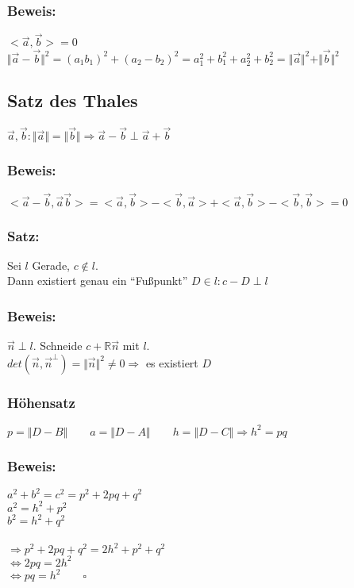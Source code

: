 \subsubsection{Beweis:}
$<\vec{a},\vec{b}>=0 $\\
$\Vert \vec{a} - \vec{b} \Vert^{2} = (a_{1}b_{1})^{2} + (a_{2} - b_{2})^{2} = a_{1}^{2}+b_{1}^{2}+a_{2}^{2}+b_{2}^{2} = \Vert \vec{a} \Vert^{2} + \Vert \vec{b} \Vert^{2}$
%
%
%
\subsection{Satz des Thales}
$\vec{a},\vec{b}: \Vert \vec{a} \Vert =\Vert \vec{b} \Vert \Rightarrow \vec{a} - \vec{b} \perp  \vec{a} + \vec{b}$
%
%
%
\subsubsection{Beweis:}
$<\vec{a}-\vec{b},\vec{a} \vec{b}> = <\vec{a},\vec{b}>-<\vec{b},\vec{a}>+<\vec{a},\vec{b}>-<\vec{b},\vec{b}>=0$
%
%
%
\subsubsection{Satz:}
Sei $l$ Gerade, $c \notin l$. \\
Dann existiert genau ein "`Fußpunkt"' $D \in l: c-D\perp l$
%
%
%
\subsubsection{Beweis:}
$\vec{n} \perp l$. Schneide $c+ \mathbb{R}\vec{n}$  mit $l$. \\
$det(\vec{n},\vec{n}^{\perp})=\Vert \vec{n}\Vert^{2} \neq 0 \Rightarrow$ es existiert $D$ 
%
%
%
\subsubsection{Höhensatz}
$p=\Vert D-B \Vert \qquad a=\Vert D-A\Vert \qquad h=\Vert D-C\Vert \Rightarrow h^{2}=pq$
%
%
%
\subsubsection{Beweis:}
$a^{2} + b^{2} = c^{2} = p^{2} + 2pq + q^{2}$\\
$a^{2}=h^{2}+p^{2}$\\
$b^{2}=h^{2}+q^{2}$\\
\qquad\\
$\Rightarrow p^{2} + 2pq +q^{2} = 2h^{2}+p^{2}+q^{2}$\\
$\Leftrightarrow 2pq = 2h^{2}$\\
$\Leftrightarrow pq=h^{2} \qquad \square$
%
%
%
